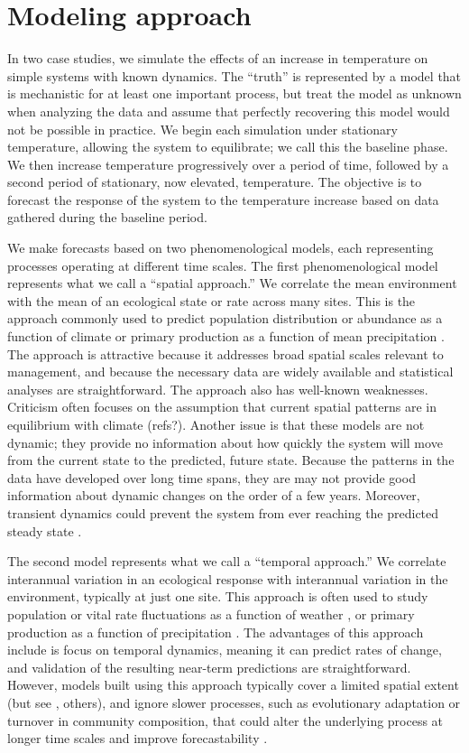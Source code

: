\documentclass[11pt]{article}
\begin{document}
\section*{Modeling approach}

In two case studies, we simulate the effects of an increase in temperature on simple systems with known dynamics.
The ``truth'' is represented by a model that is mechanistic for at least one important process, but treat the model as unknown when
analyzing the data and assume that perfectly recovering this model would not be possible in practice. We begin each simulation
under stationary temperature, allowing the system to equilibrate; we call this the baseline phase. We then increase temperature progressively
over a period of time, followed by a second period of stationary, now elevated, temperature. The objective is to forecast the response of the 
system to the temperature increase based on data gathered during the baseline period. 

We make forecasts based on two phenomenological models, each representing processes operating at different time scales. 
The first phenomenological model represents what we call a ``spatial approach.'' We correlate the mean environment with the mean of an ecological state or rate 
 across many sites. This is the approach commonly used to predict population distribution or abundance as a function of climate \citep{elith_species_2009} or
 primary production as a function of mean precipitation \citep{Sala1988}. The approach is attractive because it addresses broad spatial scales relevant to 
 management, and because the necessary data are widely available and statistical analyses are straightforward. The approach also has well-known weaknesses.
Criticism often focuses on the assumption that current spatial patterns are in equilibrium with climate (refs?). Another issue is that these models are not dynamic; 
they provide no information about how quickly the system will move from the current state to the predicted, future state. Because the patterns in the data have developed 
over long time spans, they are may not provide good information about dynamic changes on the order of a few years. Moreover, transient dynamics could 
prevent the system from ever reaching the predicted steady state \citep{Urban2012}. 

The second model represents what we call a ``temporal approach.'' We correlate interannual variation in an ecological response with interannual variation in the environment, 
typically at just one site. This approach is often used to study population or vital rate fluctuations as a function of weather \citep{dalgleish_climate_2011}, 
or primary production as a function of precipitation \citep{lauenroth_long-term_1992}. The advantages of this approach include is focus on temporal dynamics, meaning it 
can predict rates of change, and validation of the resulting near-term predictions are straightforward. However, models built using this approach typically cover 
a limited spatial extent (but see \citealt{kleinhesselink_response_2018}, others), and ignore slower processes, such as evolutionary adaptation or turnover in community composition, 
that could alter the underlying process at longer time scales and improve forecastability \citep{clark_ecological_2001}.
\end{document}
